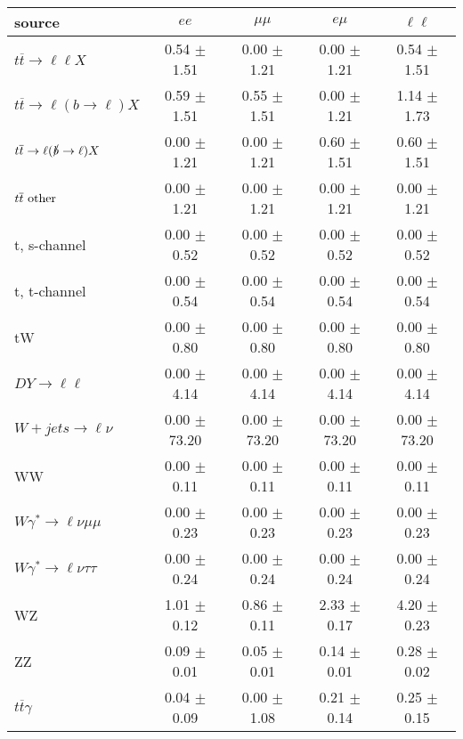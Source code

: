 \begin{tabular}{l|cccc} \hline\hline
source & $ee$ & $\mu\mu$ & $e\mu$ & $\ell\ell $ \\
\hline
$t\overline{t} \rightarrow \ell \ell X$ &  0.54 $\pm$  1.51 &  0.00 $\pm$  1.21 &  0.00 $\pm$  1.21 &  0.54 $\pm$  1.51 \\
$t\overline{t} \rightarrow \ell (b \rightarrow \ell) X$ &  0.59 $\pm$  1.51 &  0.55 $\pm$  1.51 &  0.00 $\pm$  1.21 &  1.14 $\pm$  1.73 \\
$t\overline{t} \rightarrow \ell (\slashed b \rightarrow \ell) X$ &  0.00 $\pm$  1.21 &  0.00 $\pm$  1.21 &  0.60 $\pm$  1.51 &  0.60 $\pm$  1.51 \\
        $t\overline{t}\ \rm{other}$ &  0.00 $\pm$  1.21 &  0.00 $\pm$  1.21 &  0.00 $\pm$  1.21 &  0.00 $\pm$  1.21 \\
\hline
                       t, s-channel &  0.00 $\pm$  0.52 &  0.00 $\pm$  0.52 &  0.00 $\pm$  0.52 &  0.00 $\pm$  0.52 \\
                       t, t-channel &  0.00 $\pm$  0.54 &  0.00 $\pm$  0.54 &  0.00 $\pm$  0.54 &  0.00 $\pm$  0.54 \\
                                 tW &  0.00 $\pm$  0.80 &  0.00 $\pm$  0.80 &  0.00 $\pm$  0.80 &  0.00 $\pm$  0.80 \\
\hline
         $DY \rightarrow \ell \ell$ &  0.00 $\pm$  4.14 &  0.00 $\pm$  4.14 &  0.00 $\pm$  4.14 &  0.00 $\pm$  4.14 \\
      $W+jets \rightarrow \ell \nu$ &  0.00 $\pm$ 73.20 &  0.00 $\pm$ 73.20 &  0.00 $\pm$ 73.20 &  0.00 $\pm$ 73.20 \\
                                 WW &  0.00 $\pm$  0.11 &  0.00 $\pm$  0.11 &  0.00 $\pm$  0.11 &  0.00 $\pm$  0.11 \\
\hline
$W\gamma^{*} \rightarrow \ell \nu \mu\mu$ &  0.00 $\pm$  0.23 &  0.00 $\pm$  0.23 &  0.00 $\pm$  0.23 &  0.00 $\pm$  0.23 \\
$W\gamma^{*} \rightarrow \ell \nu \tau\tau$ &  0.00 $\pm$  0.24 &  0.00 $\pm$  0.24 &  0.00 $\pm$  0.24 &  0.00 $\pm$  0.24 \\
                                 WZ &  1.01 $\pm$  0.12 &  0.86 $\pm$  0.11 &  2.33 $\pm$  0.17 &  4.20 $\pm$  0.23 \\
                                 ZZ &  0.09 $\pm$  0.01 &  0.05 $\pm$  0.01 &  0.14 $\pm$  0.01 &  0.28 $\pm$  0.02 \\
\hline
              $t\overline{t}\gamma$ &  0.04 $\pm$  0.09 &  0.00 $\pm$  1.08 &  0.21 $\pm$  0.14 &  0.25 $\pm$  0.15 \\

\end{tabular}
